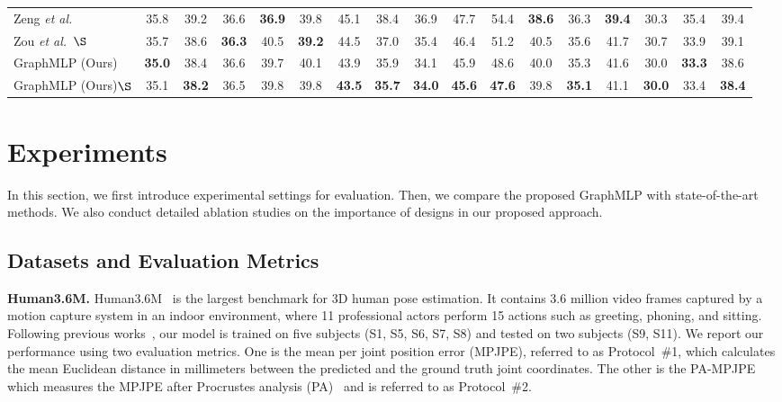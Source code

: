 \documentclass[lettersize,journal]{IEEEtran}
\begin{document}
\begin{table*}[tb]
{\begin{tabular}{@{}l|ccccccccccccccc|c@{}}
  Zeng \emph{et al.}~\cite{zeng2020srnet} &35.8 &39.2 &{36.6} &\textbf{36.9} &39.8 &45.1 &38.4 &36.9 &47.7 &54.4 &\textbf{38.6} &36.3 &\textbf{39.4} &30.3 &35.4 &39.4 \\

  Zou \emph{et al.}~\cite{zou2021modulated}$\S$ &35.7 &38.6 &\textbf{36.3} &40.5 &\textbf{39.2} &44.5 &37.0 &35.4 &46.4 &51.2 &40.5 &35.6 &41.7 &30.7 &33.9 &39.1 \\
  
  \midrule
  GraphMLP (Ours) &\textbf{35.0} &{38.4} &{36.6} &{39.7} &{40.1} &{43.9} &{35.9} &{34.1} &{45.9} &{48.6} &{40.0} &{35.3} &{41.6} &{30.0} &\textbf{33.3} &{38.6} \\

  GraphMLP (Ours)$\S$ &{35.1} &\textbf{38.2} &{36.5} &{39.8} &{39.8} &\textbf{43.5} &\textbf{35.7} &\textbf{34.0} &\textbf{45.6} &\textbf{47.6} &{39.8} &\textbf{35.1} &{41.1} &\textbf{30.0} &{33.4} &\textbf{38.4} \\

  \toprule
  \end{tabular}
  }
  \label{table:h36m}
\end{table*}

\section{Experiments}
In this section, we first introduce experimental settings for evaluation. 
Then, we compare the proposed GraphMLP with state-of-the-art methods. 
We also conduct detailed ablation studies on the importance of designs in our proposed approach. 

\subsection{Datasets and Evaluation Metrics}
\noindent \textbf{Human3.6M.} Human3.6M~\cite{ionescu2013human3} is the largest benchmark for 3D human pose estimation. 
It contains 3.6 million video frames captured by a motion capture system in an indoor environment, where 11 professional actors perform 15 actions such as greeting, phoning, and sitting. 
Following previous works~\cite{simplebaseline,xu2021graph,zeng2021learning}, our model is trained on five subjects (S1, S5, S6, S7, S8) and tested on two subjects (S9, S11). 
We report our performance using two evaluation metrics. 
One is the mean per joint position error (MPJPE), referred to as Protocol~\#1, which calculates the mean Euclidean distance in millimeters between the predicted and the ground truth joint coordinates. 
The other is the PA-MPJPE which measures the MPJPE after Procrustes analysis (PA)~\cite{gower1975generalized} and is referred to as Protocol~\#2. 
\end{document}
